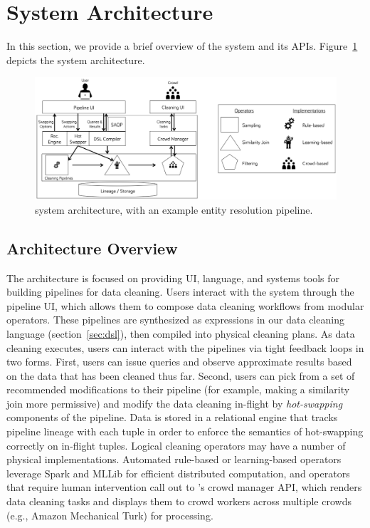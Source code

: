 \section{System Architecture}

In this section, we provide a brief overview of the \sys system and its APIs.
Figure~\ref{fig:arch} depicts the system architecture.

\begin{figure}[ht]
\centering
\includegraphics[width = \textwidth]{figs/architecture.png}
\caption{\sys system architecture, with an example entity resolution pipeline.}
\label{fig:arch}
\end{figure}

\subsection{Architecture Overview}
The \sys architecture is focused on providing UI, language, and systems tools for building pipelines for data cleaning. 
Users interact with the system through the pipeline UI, which allows them to compose data cleaning workflows from modular operators.
These pipelines are synthesized as expressions in our data cleaning language (section~\ref{sec:dsl}), then compiled into physical cleaning plans.
As data cleaning executes, users can interact with the pipelines via tight feedback loops in two forms.
First, users can issue queries and observe approximate results based on the data that has been cleaned thus far.
Second, users can pick from a set of recommended modifications to their pipeline (for example, making a similarity join more permissive) and modify the data cleaning in-flight by \textit{hot-swapping} components of the pipeline.
Data is stored in a relational engine that tracks pipeline lineage with each tuple in order to enforce the semantics of hot-swapping correctly on in-flight tuples.
Logical cleaning operators may have a number of physical implementations.
Automated rule-based or learning-based operators leverage Spark and MLLib for efficient distributed computation, and operators that require human intervention call out to \sys's crowd manager API, which renders data cleaning tasks and displays them to crowd workers across multiple crowds (e.g., Amazon Mechanical Turk) for processing.

